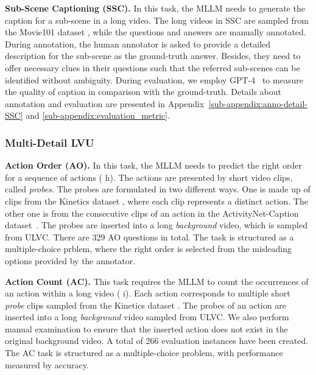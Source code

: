 \noindent\textbf{Sub-Scene Captioning (SSC).} In this task, the MLLM needs to generate the caption for a sub-scene in a long video. The long videos in SSC are sampled from the Movie101 dataset \cite{movie101-2023}, while the questions and answers are manually annotated. During annotation, the human annotator is asked to provide a detailed description for the sub-scene as the ground-truth answer. Besides, they need to offer necessary clues in their questions such that the referred sub-scenes can be identified without ambiguity. During evaluation, we employ GPT-4~\cite{achiam2023gpt} to measure the quality of caption in comparison with the ground-truth. Details about annotation and evaluation are presented in Appendix~\ref{sub-appendix:anno-detail-SSC} and \ref{sub-appendix:evaluation_metric}. 

\subsubsection{Multi-Detail LVU}

\textbf{Action Order (AO).} In this task, the MLLM needs to predict the right order for a sequence of actions ( h). The actions are presented by short video clips, called \textit{probes}. The probes are formulated in two different ways. One is made up of clips from the Kinetics dataset \cite{kinetics-2017}, where each clip represents a distinct action. The other one is from the consecutive clips of an action in the ActivityNet-Caption dataset~\cite{activitynet-caption2017}. The probes are inserted into a long \textit{background} video, which is sampled from ULVC. There are 329 AO questions in total. The task is structured as a multiple-choice prblem, where the right order is selected from the misleading options provided by the annotator. 

\noindent\textbf{Action Count (AC).} This task requires the MLLM to count the occurrences of an action within a long video ( i). Each action corresponds to multiple short \textit{probe} clips sampled from the Kinetics dataset \cite{kinetics-2017}. The probes of an action are inserted into a long \textit{background} video sampled from ULVC. We also perform manual examination to ensure that the inserted action does not exist in the original background video. A total of 266 evaluation instances have been created. The AC task is structured as a multiple-choice problem, with performance measured by accuracy. 

